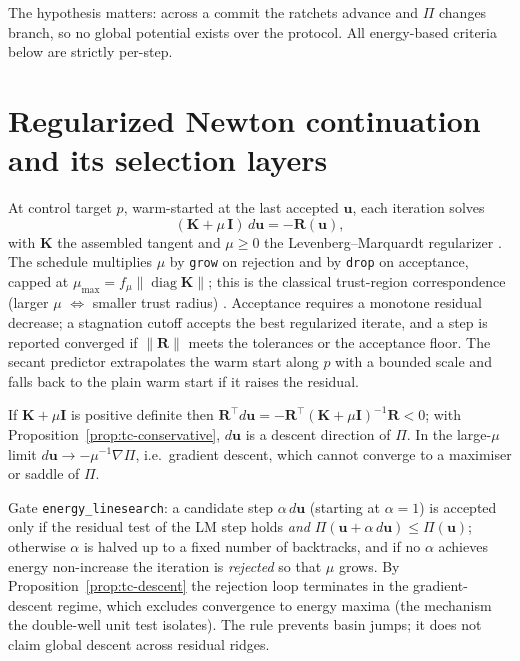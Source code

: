 \begin{remark}
The hypothesis matters: across a commit the ratchets advance and
$\Pi$ changes branch, so no global potential exists over the protocol.
All energy-based criteria below are strictly per-step.
\end{remark}

\section{Regularized Newton continuation and its selection layers}
\label{sec:tc-lm}

\begin{definition}[LM step]
At control target $p$, warm-started at the last accepted $\mathbf u$,
each iteration solves
\[
  (\mathbf K + \mu\,\mathbf I)\, d\mathbf u = -\mathbf R(\mathbf u),
\]
with $\mathbf K$ the assembled tangent and $\mu\ge0$ the
Levenberg--Marquardt regularizer \cite{Levenberg1944,Marquardt1963}.
The schedule multiplies $\mu$ by \texttt{grow} on rejection and by
\texttt{drop} on acceptance, capped at
$\mu_{\max}=f_{\mu}\lVert\operatorname{diag}\mathbf K\rVert$; this is
the classical trust-region correspondence (larger $\mu$
$\Leftrightarrow$ smaller trust radius)
\cite{NocedalWright2006,ConnGouldToint2000}. Acceptance requires a
monotone residual decrease; a stagnation cutoff accepts the best
regularized iterate, and a step is reported converged if
$\lVert\mathbf R\rVert$ meets the tolerances or the acceptance floor.
The secant predictor extrapolates the warm start along $p$ with a
bounded scale and falls back to the plain warm start if it raises the
residual.
\end{definition}

\begin{proposition}
\label{prop:tc-descent}
If $\mathbf K+\mu\mathbf I$ is positive definite then
$\mathbf R^\top d\mathbf u = -\mathbf R^\top(\mathbf K+\mu\mathbf
I)^{-1}\mathbf R < 0$; with
Proposition~\ref{prop:tc-conservative}, $d\mathbf u$ is a descent
direction of $\Pi$. In the large-$\mu$ limit $d\mathbf u \to
-\mu^{-1}\nabla\Pi$, i.e.\ gradient descent, which cannot converge to
a maximiser or saddle of $\Pi$.
\end{proposition}

\begin{definition}
\label{def:tc-ls}
Gate \texttt{energy\_linesearch}: a candidate step $\alpha\,d\mathbf
u$ (starting at $\alpha=1$) is accepted only if the residual test of
the LM step holds \emph{and}
$\Pi(\mathbf u+\alpha\,d\mathbf u)\le\Pi(\mathbf u)$; otherwise
$\alpha$ is halved up to a fixed number of backtracks, and if no
$\alpha$ achieves energy non-increase the iteration is \emph{rejected}
so that $\mu$ grows. By Proposition~\ref{prop:tc-descent} the
rejection loop terminates in the gradient-descent regime, which
excludes convergence to energy maxima (the mechanism the double-well
unit test isolates). The rule prevents basin jumps; it does not claim
global descent across residual ridges.
\end{definition}

